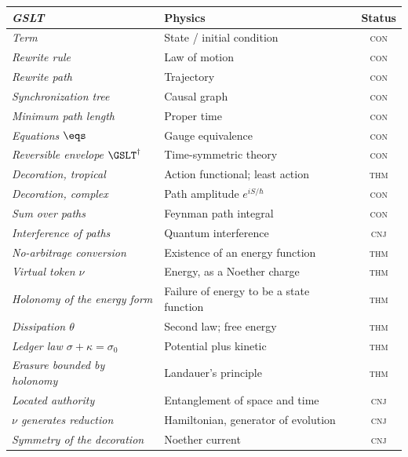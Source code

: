 \begin{center}
\renewcommand{\arraystretch}{1.35}
\begin{tabular}{>{\itshape}p{4.3cm} p{5.9cm} c}
\toprule
\normalfont\textbf{GSLT} & \textbf{Physics} & \textbf{Status} \\
\midrule
Term                          & State / initial condition & \textsc{con} \\
Rewrite rule                  & Law of motion & \textsc{con} \\
Rewrite path                  & Trajectory & \textsc{con} \\
Synchronization tree          & Causal graph & \textsc{con} \\
Minimum path length           & Proper time & \textsc{con} \\
Equations $\eqs$              & Gauge equivalence & \textsc{con} \\
Reversible envelope $\GSLT^\dagger$ & Time-symmetric theory & \textsc{con} \\
Decoration, tropical          & Action functional; least action & \textsc{thm} \\
Decoration, complex           & Path amplitude $e^{iS/\hbar}$ & \textsc{con} \\
Sum over paths                & Feynman path integral & \textsc{con} \\
Interference of paths         & Quantum interference & \textsc{cnj} \\
No-arbitrage conversion       & Existence of an energy function & \textsc{thm} \\
Virtual token $\nu$           & Energy, as a Noether charge & \textsc{thm} \\
Holonomy of the energy form   & Failure of energy to be a state function & \textsc{thm} \\
Dissipation $\theta$          & Second law; free energy & \textsc{thm} \\
Ledger law $\sigma+\kappa=\sigma_0$ & Potential plus kinetic & \textsc{thm} \\
Erasure bounded by holonomy   & Landauer's principle & \textsc{thm} \\
Located authority             & Entanglement of space and time & \textsc{cnj} \\
$\nu$ generates reduction     & Hamiltonian, generator of evolution & \textsc{cnj} \\
Symmetry of the decoration    & Noether current & \textsc{cnj} \\
\bottomrule
\end{tabular}
\end{center}

